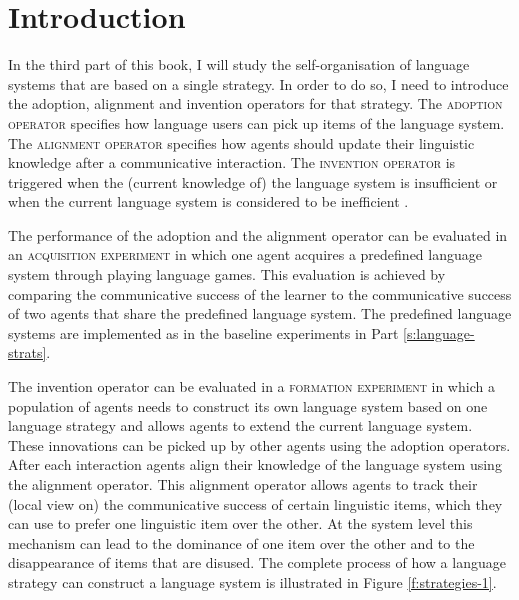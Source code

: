 \section*{Introduction}

\addtocounter{chapter}{1}
\setcounter{figure}{0}

In the third part of this book, I will study the self-organisation of
language systems that are based on a single strategy. In order to do
so, I need to introduce the adoption, alignment and invention
operators for that strategy. The \textsc{adoption operator} specifies how language users can pick up items of the language
system. The \textsc{alignment operator}
specifies how agents should
update their linguistic knowledge after a communicative
interaction. The \textsc{invention operator}
is triggered when the
(current knowledge of) the language system is insufficient or when the
current language system is considered to be inefficient
\citep{steels06how}.

The performance of the adoption and the alignment operator can be
evaluated in an \textsc{acquisition experiment} 
in which one agent
acquires a predefined language system through playing language games.
This evaluation is achieved by comparing the communicative success of the
learner to the communicative success of two agents that share the
predefined language system. The predefined language systems are
implemented as in the baseline experiments in Part
\ref{s:language-strats}.

The invention operator can be evaluated in a \textsc{formation
  experiment} in which a population of
agents needs to construct its own language system based on one
language strategy and allows agents to extend the current language
system. These innovations can be picked up by other agents using the
adoption operators. After each interaction agents align their
knowledge of the language system using the alignment operator. This
alignment operator allows agents to track their (local view on) the
communicative success of certain linguistic items, which they can use
to prefer one linguistic item over the other. At the system level this
mechanism can lead to the dominance of one item over the other and to
the disappearance of items that are disused. The complete process of
how a language strategy can construct a language system is illustrated
in Figure \ref{f:strategies-1}.\enlargethispage{3\baselineskip}

